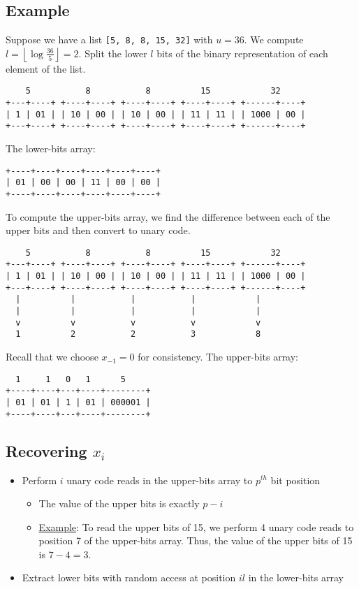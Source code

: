 \documentclass[10pt]{article}
\begin{document}
\subsection{Example}\label{example}
Suppose we have a list \texttt{[5, 8, 8, 15, 32]} with \(u= 36\).
We compute \(l = \left \lfloor \log{\frac{36}{5}} \right \rfloor = 2 \).
Split the lower \(l\) bits of the binary representation of each element of the list.
\begin{verbatim}
    5           8           8          15            32
+---+----+ +----+----+ +----+----+ +----+----+ +------+----+
| 1 | 01 | | 10 | 00 | | 10 | 00 | | 11 | 11 | | 1000 | 00 |
+---+----+ +----+----+ +----+----+ +----+----+ +------+----+
\end{verbatim}
The lower-bits array:
\begin{verbatim}
+----+----+----+----+----+----+
| 01 | 00 | 00 | 11 | 00 | 00 |
+----+----+----+----+----+----+
\end{verbatim}
To compute the upper-bits array, we find the difference between each of the upper bits
and then convert to unary code.
\begin{verbatim}
    5           8           8          15            32
+---+----+ +----+----+ +----+----+ +----+----+ +------+----+
| 1 | 01 | | 10 | 00 | | 10 | 00 | | 11 | 11 | | 1000 | 00 |
+---+----+ +----+----+ +----+----+ +----+----+ +------+----+
  |          |           |           |            |
  |          |           |           |            |
  v          v           v           v            v
  1          2           2           3            8
\end{verbatim}
Recall that we choose \(x_{-1} = 0\) for consistency.
The upper-bits array:
\begin{verbatim}
  1     1   0   1      5
+----+----+---+----+--------+
| 01 | 01 | 1 | 01 | 000001 |
+----+----+---+----+--------+
\end{verbatim}

\subsection{Recovering \texorpdfstring{\(x_i\)}{xi}}\label{recovering-xi}
\begin{itemize}
\item
    Perform \(i\) unary code reads in the upper-bits array to \(p^{th}\) bit position
    \begin{itemize}
    \item
        The value of the upper bits is exactly \(p - i\)
    \item
        \underline{Example}: To read the upper bits of 15, we perform 4 unary code reads to 
        position 7 of the upper-bits array.
        Thus, the value of the upper bits of 15 is \(7 - 4 = 3\).
    \end{itemize}
\item
    Extract lower bits with random access at position \(il\) in the lower-bits array
\end{itemize}
\end{document}
